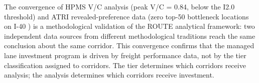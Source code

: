 The convergence of HPMS V/C analysis (peak V/C = 0.84, below the I2.0 threshold) and ATRI revealed-preference data (zero top-50 bottleneck locations on I-40 \citep{ROUTE_B2}) is a methodological validation of the ROUTE analytical framework: two independent data sources from different methodological traditions reach the same conclusion about the same corridor. This convergence confirms that the managed lane investment program is driven by freight performance data, not by the tier classification assigned to corridors. The tier determines which corridors receive analysis; the analysis determines which corridors receive investment.
